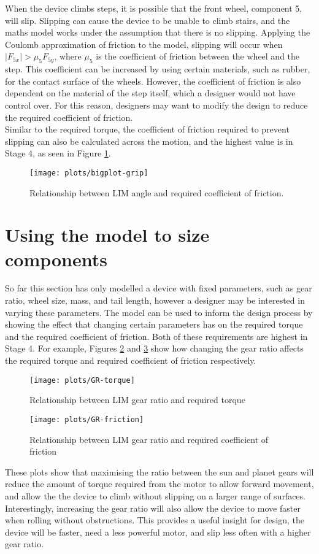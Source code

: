 When the device climbs steps, it is possible that the front wheel, component 5, will slip. Slipping can cause the device to be unable to climb stairs, and the maths model works under the assumption that there is no slipping. Applying the Coulomb approximation of friction to the model, slipping will occur when $|F_{5x}| > \mu_5 F_{5y}$, where $\mu_5$ is the coefficient of friction between the wheel and the step. This coefficient can be increased by using certain materials, such as rubber, for the contact surface of the wheels. However, the coefficient of friction is also dependent on the material of the step itself, which a designer would not have control over. For this reason, designers may want to modify the design to reduce the required coefficient of friction.\\
Similar to the required torque, the coefficient of friction required to prevent slipping can also be calculated across the motion, and the highest value is in Stage 4, as seen in Figure \ref{bigplot-grip}.

\begin{figure}[h]
	\centering
	\texttt{[image: plots/bigplot-grip]}
	\caption{Relationship between LIM angle and required coefficient of friction.}
	\label{bigplot-grip}
\end{figure}

\section{Using the model to size components}
So far this section has only modelled a device with fixed parameters, such as gear ratio, wheel size, mass, and tail length, however a designer may be interested in varying these parameters. The model can be used to inform the design process by showing the effect that changing certain parameters has on the required torque and the required coefficient of friction. Both of these requirements are highest in Stage 4. For example, Figures \ref{fig:GR-torque} and \ref{fig:GR-friction} show how changing the gear ratio affects the required torque and required coefficient of friction respectively.\\

\begin{figure}[h]
	\centering
	\texttt{[image: plots/GR-torque]}
	\caption{Relationship between LIM gear ratio and required torque}
	\label{fig:GR-torque}
\end{figure}
\begin{figure}[h]
	\centering
	\texttt{[image: plots/GR-friction]}
	\caption{Relationship between LIM gear ratio and required coefficient of friction}
	\label{fig:GR-friction}
\end{figure}
These plots show that maximising the ratio between the sun and planet gears will reduce the amount of torque required from the motor to allow forward movement, and allow the the device to climb without slipping on a larger range of surfaces. Interestingly, increasing the gear ratio will also allow the device to move faster when rolling without obstructions. This provides a useful insight for design, the device will be faster, need a less powerful motor, and slip less often with a higher gear ratio.
